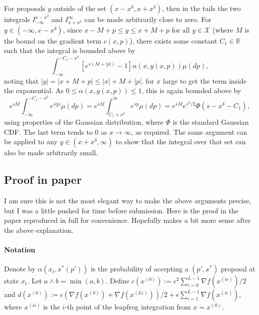 \documentclass{article}
\newcommand{\X}{\mathcal{X}}
\begin{document}
For proposals $y$ outside of the set $(x - x^\delta,x + x^\delta)$, then in the tails the two integrals $I_{-\infty}^{x - x^\delta}$ and $I_{x + x^\delta}^\infty$ can be made arbitrarily close to zero.  For $y \in (-\infty,x-x^{\delta})$, since $x - M + p \leq y \leq x + M + p$ for all $y \in \X$ (where $M$ is the bound on the gradient term $c(x,p)$), there exists some constant $C_1 \in \mathbb{R}$ such that the integral is bounded above by
\[
\int_{-\infty}^{- C_1 - x^\delta} \left[e^{s(M + |p|)} - 1 \right]\alpha(x,y(x,p))\mu(dp),
\]
noting that $|y| = |x + M + p| \leq |x| + M + |p|$.  for $x$ large to get the term inside the exponential. As $0 \leq \alpha(x,y(x,p)) \leq 1$, this is again bounded above by
\[
e^{sM}\int_{-\infty}^{- C_1 - x^\delta} e^{s|p|}\mu(dp) = e^{sM}\int_{C_1 + x^{\delta}}^{\infty} e^{sp}\mu(dp) = e^{sM}e^{s^2/2}\Phi(s - x^\delta - C_1),
\]
using properties of the Gaussian distribution, where $\Phi$ is the standard Gaussian CDF.  The last term tends to $0$ as $x \to \infty$, as required.  The same argument can be applied to any $y \in (x + x^\delta,\infty)$ to show that the integral over that set can also be made arbitrarily small.

\subsection{Proof in paper}

I am sure this is not the most elegant way to make the above arguments precise, but I was a little pushed for time before submission.  Here is the proof in the paper reproduced in full for convenience.  Hopefully makes a bit more sense after the above explanation.

\paragraph{Notation}

Denote by $\alpha(x_{t},x^{*}(p'))$ is the probability of accepting
a $(p',x^{*})$ proposal at state $x_{t}$. Let $a\wedge b=\min(a,b)$.
Define $c(x^{(0)}):=\epsilon^{2}\sum_{i=0}^{L-1}\nabla f(x^{(i\epsilon)})/2$
and $d(x^{(0)}):=\epsilon(\nabla f(x^{(0)})+\nabla f(x^{(L\epsilon)}))/2+\epsilon\sum_{i=1}^{L-1}\nabla f(x^{(i\epsilon)})$,
where $x^{(i\epsilon)}$ is the $i$-th point of the leapfrog integration
from $x=x^{(0)}$.
\end{document}
